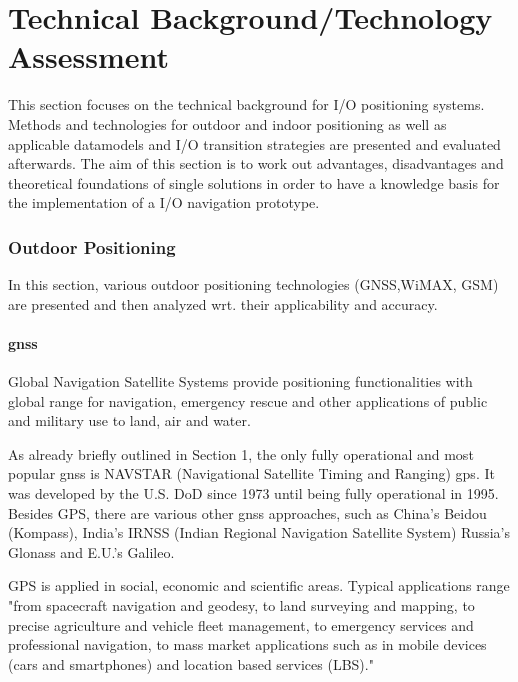 \chapter{Technical Background/Technology Assessment}

This section focuses on the technical background for I/O positioning systems. Methods and technologies for outdoor and indoor positioning as well as applicable datamodels and I/O transition strategies are presented and evaluated afterwards. The aim of this section is to work out advantages, disadvantages and theoretical foundations of single solutions in order to have a knowledge basis for the implementation of a I/O navigation prototype.

\subsection{Outdoor Positioning}
In this section, various outdoor positioning technologies (GNSS,WiMAX, GSM) are presented and then analyzed wrt. their applicability and accuracy.

\subsubsection{\ac{gnss}}

Global Navigation Satellite Systems provide positioning functionalities with global range for navigation, emergency rescue and other applications of public and military use to land, air and water.

As already briefly outlined in Section 1, the only fully operational and most popular \ac{gnss} is NAVSTAR (Navigational Satellite Timing and Ranging) \ac{gps}. It was developed by the U.S. DoD since 1973 until being fully operational in 1995. 
Besides GPS, there are various other \ac{gnss} approaches, such as China's Beidou (Kompass), India's IRNSS (Indian Regional Navigation Satellite System) Russia's Glonass and E.U.'s Galileo. \cite{heiseOnlineGPS}


GPS is applied in social, economic and scientific areas. Typical applications range "from spacecraft navigation and geodesy, to land surveying and mapping, to precise agriculture and vehicle fleet management, to emergency services and professional navigation, to mass market applications such as in mobile devices (cars and smartphones) and location based services (LBS)."\cite{liRizos}

